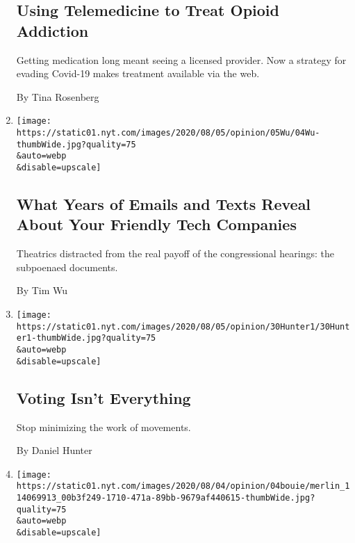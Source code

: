 \begin{enumerate}
  \hypertarget{using-telemedicine-to-treat-opioid-addiction}{%
  \subsection{Using Telemedicine to Treat Opioid
  Addiction}\label{using-telemedicine-to-treat-opioid-addiction}}

  Getting medication long meant seeing a licensed provider. Now a
  strategy for evading Covid-19 makes treatment available via the web.

  By Tina Rosenberg
\item
  \href{/2020/08/04/opinion/amazon-facebook-congressional-hearings.html}{}

  \texttt{[image: https://static01.nyt.com/images/2020/08/05/opinion/05Wu/04Wu-thumbWide.jpg?quality=75\\\&auto=webp\\\&disable=upscale]}

  \hypertarget{what-years-of-emails-and-texts-reveal-about-your-friendly-tech-companies}{%
  \subsection{What Years of Emails and Texts Reveal About Your Friendly
  Tech
  Companies}\label{what-years-of-emails-and-texts-reveal-about-your-friendly-tech-companies}}

  Theatrics distracted from the real payoff of the congressional
  hearings: the subpoenaed documents.

  By Tim Wu
\item
  \href{/2020/08/04/opinion/voting-2020-election-blm-movement.html}{}

  \texttt{[image: https://static01.nyt.com/images/2020/08/05/opinion/30Hunter1/30Hunter1-thumbWide.jpg?quality=75\\\&auto=webp\\\&disable=upscale]}

  \hypertarget{voting-isnt-everything}{%
  \subsection{Voting Isn't Everything}\label{voting-isnt-everything}}

  Stop minimizing the work of movements.

  By Daniel Hunter
\item
  \href{/2020/08/04/opinion/trump-2020-electoral-college.html}{}

  \texttt{[image: https://static01.nyt.com/images/2020/08/04/opinion/04bouie/merlin\_114069913\_00b3f249-1710-471a-89bb-9679af440615-thumbWide.jpg?quality=75\\\&auto=webp\\\&disable=upscale]}


\end{enumerate}
